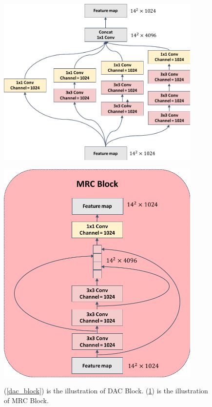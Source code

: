 \documentclass[UTF8]{article} %
\begin{document}
\begin{figure}[htbp]
  \centering
  \begin{minipage}[t]{0.48\textwidth}
  \centering
  \includegraphics[width=0.9\textwidth]{DAC_block.pdf}
  \label{dac_block}
  \end{minipage}
  \begin{minipage}[t]{0.48\textwidth}
  \centering
  \includegraphics[width=0.9\textwidth]{MRC_block.pdf}
  \label{mrc_block}
  \end{minipage}
  \caption{(\ref{dac_block}) is the illustration of DAC Block. (\ref{mrc_block}) is the illustration of MRC Block.}
\end{figure}
  
\end{document}
